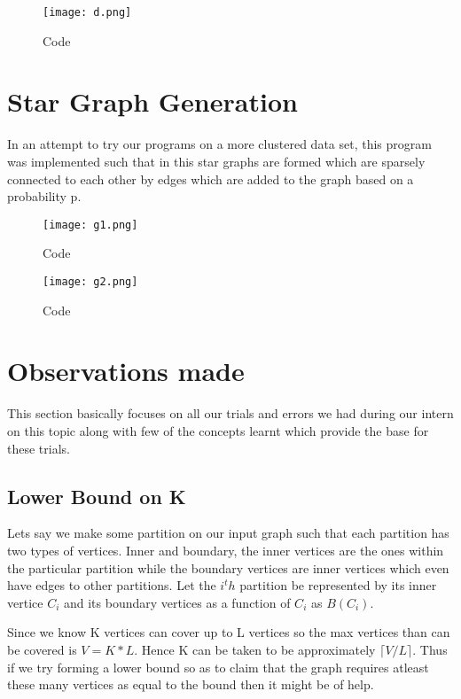 \documentclass[12pt,a4paper,onecolumn]{article}
\begin{document}
\begin{figure}[H]
 \texttt{[image: d.png]}
  \caption{Code}
  \label{Figure 7}
\end{figure}

\section{Star Graph Generation}
In an attempt to try our programs on a more clustered data set, this program was implemented such that in this star graphs are formed which are sparsely connected to each other by edges which are added to the graph based on a probability p.

\begin{figure}[H]
 \texttt{[image: g1.png]}
  \caption{Code}
  \label{Figure 8}
\end{figure}

\begin{figure}[H]
 \texttt{[image: g2.png]}
  \caption{Code}
  \label{Figure 9}
\end{figure}

\section{Observations made}
This section basically focuses on all our trials and errors we had during our intern on this topic along with few of the concepts learnt which provide the base for these trials.
\subsection{Lower Bound on K}
Lets say we make some partition on our input graph such that each partition has two types of vertices. Inner and boundary, the inner vertices are the ones within the particular partition while the boundary vertices are inner vertices which even have edges to other partitions. Let the $i^th$ partition be represented by its inner vertice $C_i$ and its boundary vertices as a function of $C_i$ as $B(C_i)$.

Since we know K vertices can cover up to L vertices so the max vertices than can be covered is $V = K*L$. Hence K can be taken to be approximately $\lceil V/L\rceil$. Thus if we try forming a lower bound so as to claim that the graph requires atleast these many vertices as equal to the bound then it might be of help. 
\end{document}
